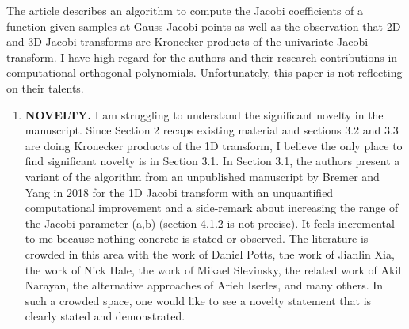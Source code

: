 \documentclass[11pt]{article}
\begin{document}

\vspace{0.5in}

 The article describes an algorithm to compute the Jacobi coefficients of a function given samples at Gauss-Jacobi points as well as the
observation that 2D and 3D Jacobi transforms are Kronecker products of the univariate Jacobi transform. I have high regard for the
authors and their research contributions in computational orthogonal polynomials. Unfortunately, this paper is not reflecting on their talents.

\begin{enumerate}
\item \textbf{NOVELTY.} I am struggling to understand the significant novelty in the manuscript. Since Section 2 recaps existing material and
sections 3.2 and 3.3 are doing Kronecker products of the 1D transform, I believe the only place to find significant novelty is in Section
3.1. In Section 3.1, the authors present a variant of the algorithm from an unpublished manuscript by Bremer and Yang in 2018 for
the 1D Jacobi transform with an unquantified computational improvement and a side-remark about increasing the range of the Jacobi
parameter (a,b) (section 4.1.2 is not precise). It feels incremental to me because nothing concrete is stated or observed. The
literature is crowded in this area with the work of Daniel Potts, the work of Jianlin Xia, the work of Nick Hale, the work of Mikael
Slevinsky, the related work of Akil Narayan, the alternative approaches of Arieh Iserles, and many others. In such a crowded space,
one would like to see a novelty statement that is clearly stated and demonstrated. 


\end{enumerate}
\end{document}
